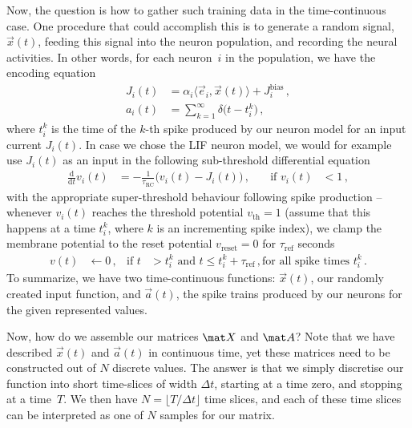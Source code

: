 \documentclass[10pt,letterpaper,oneside]{article}
\begin{document}
Now, the question is how to gather such training data in the time-continuous case. One procedure that could accomplish this is to generate a random signal, $\vec x(t)$, feeding this signal into the neuron population, and recording the neural activities. In other words, for each neuron~$i$ in the population, we have the encoding equation
\begin{align*}
J_i(t) &= \alpha_i \langle \vec e_i, \vec x(t) \rangle + J^\mathrm{bias}_i \,, \\
a_i(t) &= \sum_{k=1}^\infty \delta\big(t - t^k_i\big) \,,
\end{align*}
where $t^k_i$ is the time of the $k$-th spike produced by our neuron model for an input current $J_i(t)$. In case we chose the LIF neuron model, we would for example use $J_i(t)$ as an input in the following sub-threshold differential equation
\begin{align*}
\frac{\mathrm{d}}{\mathrm{d}t} v_i(t) &= -\frac{1}{\tau_\mathrm{RC}} \big( v_i(t) - J_i(t) \big) \,, \quad &\text{if } v_i(t) &< 1\,,
\end{align*}
with the appropriate super-threshold behaviour following spike production -- whenever $v_i(t)$ reaches the threshold potential $v_\mathrm{th} = 1$ (assume that this happens at a time $t_i^k$, where $k$ is an incrementing spike index), we clamp the membrane potential to the reset potential $v_\mathrm{reset} = 0$ for $\tau_\mathrm{ref}$ seconds
\begin{align*}
v(t) &\gets 0 \,, &\text{if } t &> t_i^k \text{ and } t \leq t_i^k + \tau_\mathrm{ref} \,, \text{for all spike times } t_i^k \,.
\end{align*}
To summarize, we have two time-continuous functions: $\vec x(t)$, our randomly created input function, and $\vec a(t)$, the spike trains produced by our neurons for the given represented values.

Now, how do we assemble our matrices $\mat X$ and $\mat A$? Note that we have described $\vec x(t)$ and $\vec a(t)$ in continuous time, yet these matrices need to be constructed out of $N$ discrete values. The answer is that we simply discretise our function into short time-slices of width $\Delta t$, starting at a time zero, and stopping at a time~$T$. We then have $N = \lfloor T / \Delta t \rfloor$ time slices, and each of these time slices can be interpreted as one of $N$ samples for our matrix.
\end{document}
